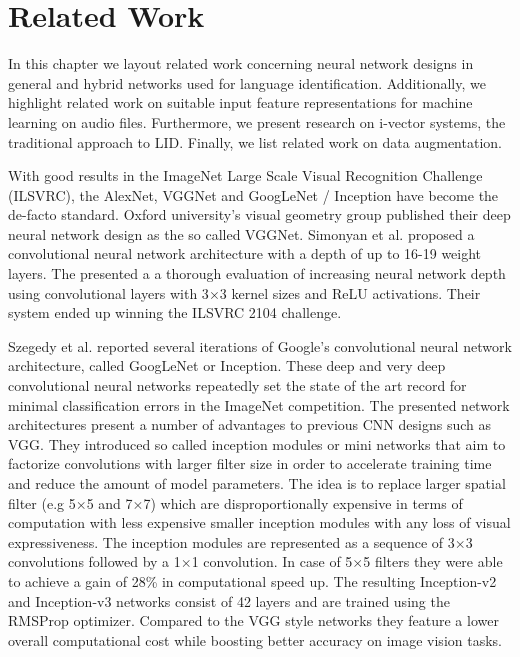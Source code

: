 \section{Related Work}
\label{sec:related_work}
In this chapter we layout related work concerning neural network designs in general and hybrid networks used for language identification. Additionally, we highlight related work on suitable input feature representations for machine learning on audio files. Furthermore, we present research on i-vector systems, the traditional approach to LID. Finally, we list related work on data augmentation. 
	
%	


With good results in the ImageNet Large Scale Visual Recognition Challenge (ILSVRC)\cite{ILSVRC15}, the AlexNet\cite{krizhevsky2012imagenet}, VGGNet\cite{simonyan2014very} and GoogLeNet / Inception\cite{szegedy2015going} have become the de-facto standard. 
Oxford university's visual geometry group published their deep neural network design as the so called VGGNet. Simonyan et al.\cite{simonyan2014very, Chatfield14} proposed a convolutional neural network architecture with a depth of up to 16-19 weight layers. The presented a a thorough evaluation of increasing neural network depth using convolutional layers with 3$\times$3 kernel sizes and ReLU activations. Their system ended up winning the ILSVRC 2104 challenge.

Szegedy et al. reported several iterations of Google's convolutional neural network architecture, called GoogLeNet or Inception\cite{szegedy2015going, szegedy2016rethinking, szegedy2016inception}. These deep and very deep convolutional neural networks repeatedly set the state of the art record for minimal classification errors in the ImageNet competition. The presented network architectures present a number of advantages to previous CNN designs such as VGG. They introduced so called inception modules or mini networks that aim to factorize convolutions with larger filter size in order to accelerate training time and reduce the amount of model parameters. The idea is to replace larger spatial filter (e.g 5$\times$5 and 7$\times$7) which are disproportionally expensive in terms of computation with less expensive smaller inception modules with any loss of visual expressiveness. The inception modules are represented as a sequence of 3$\times$3 convolutions followed by a 1$\times$1 convolution. In case of 5$\times$5 filters they were able to achieve a gain of 28\% in computational speed up. The resulting Inception-v2 and Inception-v3 networks consist of 42 layers and are trained using the RMSProp\cite{tieleman2012lecture} optimizer. Compared to the VGG style networks they feature a lower overall computational cost while boosting better accuracy on image vision tasks.

